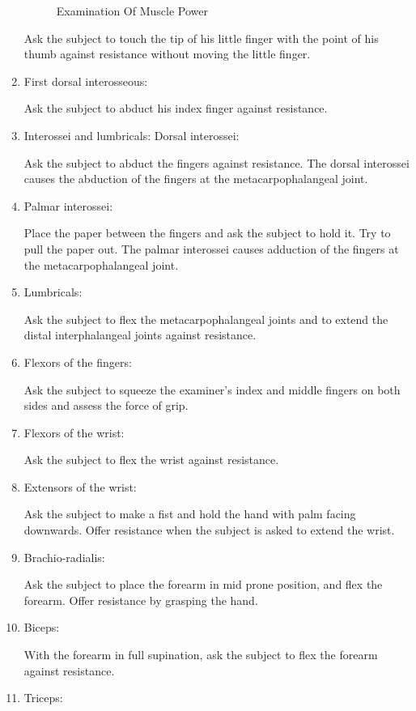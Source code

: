 \documentclass[a4paper,12pt,openany,oneside]{book}
\begin{document}
\begin{enumerate}
{{\begin{figure}[H]
\begin{subfigure}[t]{\textwidth}
		\end{subfigure}
		\hspace{\fill}
			\caption*{Examination Of Muscle Power}
		\end{figure}
		}
	\par
	Ask the subject to touch the tip of his little finger with the point of his thumb against resistance without moving the little finger.
}
\item{ First dorsal interosseous:
	\par
	Ask the subject to abduct his index finger against resistance.
}
\item{ Interossei and lumbricals: Dorsal interossei:
	\par
	Ask the subject to abduct the fingers against resistance. The dorsal interossei causes the abduction of the fingers at the metacarpophalangeal joint.
}
\item{	Palmar interossei:
	\par
	Place the paper between the fingers and ask the subject to hold it. Try to pull the paper out. The palmar interossei causes adduction of the fingers at the metacarpophalangeal joint.
			}
\item{Lumbricals:
	\par
	Ask the subject to flex the metacarpophalangeal joints and to extend the distal interphalangeal joints against resistance.
}
\item{ Flexors of the fingers: 
\par
Ask the subject to squeeze the examiner's index and middle fingers on both sides and assess the force of grip.
}
\item{ Flexors of the wrist: 
\par
Ask the subject to flex the wrist against resistance.
}
\item{ Extensors of the wrist: 
\par
Ask the subject to make a fist and hold the hand with palm facing downwards. Offer resistance when the subject is asked to extend the wrist.
}
\item{ Brachio-radialis: 
\par
Ask the subject to place the forearm in mid prone position, and flex the forearm. Offer resistance by grasping the hand.
}
\item{ Biceps: 
\par
With the forearm in full supination, ask the subject to flex the forearm against resistance.
}
\item{ Triceps: 
\par
}
\end{enumerate}
\end{document}
